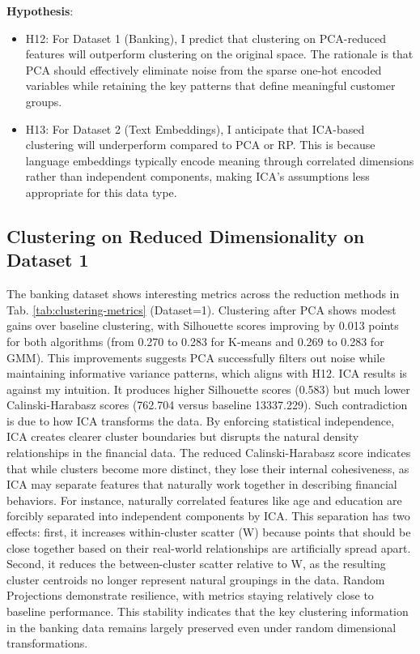 \documentclass[conference]{IEEEtran}
\begin{document}
\textbf{Hypothesis}:
\begin{itemize}
    \item H12: For Dataset 1 (Banking), I predict that clustering on PCA-reduced features will outperform clustering on the original space. The rationale is that PCA should effectively eliminate noise from the sparse one-hot encoded variables while retaining the key patterns that define meaningful customer groups.
    \item H13: For Dataset 2 (Text Embeddings), I anticipate that ICA-based clustering will underperform compared to PCA or RP. This is because language embeddings typically encode meaning through correlated dimensions rather than independent components, making ICA's assumptions less appropriate for this data type.
\end{itemize}

\subsection{Clustering on Reduced Dimensionality on Dataset 1}
The banking dataset shows interesting metrics across the reduction methods in Tab. \ref{tab:clustering-metrics} (Dataset=1). Clustering after PCA shows modest gains over baseline clustering, with Silhouette scores improving by 0.013 points for both algorithms (from 0.270 to 0.283 for K-means and 0.269 to 0.283 for GMM). This improvements suggests PCA successfully filters out noise while maintaining informative variance patterns, which aligns with H12. ICA results is against my intuition. It produces higher Silhouette scores (0.583) but much lower Calinski-Harabasz scores (762.704 versus baseline 13337.229). Such contradiction is due to how ICA transforms the data. By enforcing statistical independence, ICA creates clearer cluster boundaries but disrupts the natural density relationships in the financial data. The reduced Calinski-Harabasz score indicates that while clusters become more distinct, they lose their internal cohesiveness, as ICA may separate features that naturally work together in describing financial behaviors. For instance, naturally correlated features like age and education are forcibly separated into independent components by ICA. This separation has two effects: first, it increases within-cluster scatter (W) because points that should be close together based on their real-world relationships are artificially spread apart. Second, it reduces the between-cluster scatter relative to W, as the resulting cluster centroids no longer represent natural groupings in the data.
Random Projections demonstrate resilience, with metrics staying relatively close to baseline performance. This stability indicates that the key clustering information in the banking data remains largely preserved even under random dimensional transformations.
\end{document}
